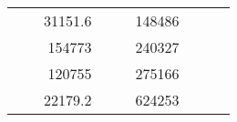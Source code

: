 \begin{table}[H]
\begin{tabular}{|ccrccrccc}
\multicolumn{1}{|c|}{\cellcolor[HTML]{FFFFC7}}                                & \multicolumn{1}{c|}{\cellcolor[HTML]{DDFDFF}}                      & \multicolumn{1}{r|}{\cellcolor[HTML]{DAE8FC}31151.6}   & \multicolumn{1}{c|}{\cellcolor[HTML]{FFFFC7}}                                & \multicolumn{1}{c|}{\cellcolor[HTML]{DDFDFF}}                       & \multicolumn{1}{r|}{\cellcolor[HTML]{DDFDFF}148486}    &                                                                              &                                                                    &                                                        \\ \cline{3-3} \cline{6-6}
\multicolumn{1}{|c|}{\cellcolor[HTML]{FFFFC7}}                                & \multicolumn{1}{c|}{\cellcolor[HTML]{DDFDFF}}                      & \multicolumn{1}{r|}{\cellcolor[HTML]{DDFDFF}154773}    & \multicolumn{1}{c|}{\cellcolor[HTML]{FFFFC7}}                                & \multicolumn{1}{c|}{\cellcolor[HTML]{DDFDFF}}                       & \multicolumn{1}{r|}{\cellcolor[HTML]{DAE8FC}240327}    &                                                                              &                                                                    &                                                        \\ \cline{3-3} \cline{6-6}
\multicolumn{1}{|c|}{\cellcolor[HTML]{FFFFC7}}                                & \multicolumn{1}{c|}{\cellcolor[HTML]{DDFDFF}}                      & \multicolumn{1}{r|}{\cellcolor[HTML]{DAE8FC}120755}    & \multicolumn{1}{c|}{\cellcolor[HTML]{FFFFC7}}                                & \multicolumn{1}{c|}{\cellcolor[HTML]{DDFDFF}}                       & \multicolumn{1}{r|}{\cellcolor[HTML]{DDFDFF}275166}    &                                                                              &                                                                    &                                                        \\ \cline{3-3} \cline{6-6}
\multicolumn{1}{|c|}{\cellcolor[HTML]{FFFFC7}}                                & \multicolumn{1}{c|}{\cellcolor[HTML]{DDFDFF}}                      & \multicolumn{1}{r|}{\cellcolor[HTML]{DDFDFF}22179.2}   & \multicolumn{1}{c|}{\cellcolor[HTML]{FFFFC7}}                                & \multicolumn{1}{c|}{\cellcolor[HTML]{DDFDFF}}                       & \multicolumn{1}{r|}{\cellcolor[HTML]{DAE8FC}624253}    &                                                                              &                                                                    &                                                        \\ \cline{3-3} \cline{6-6}

\end{tabular}
\end{table}
